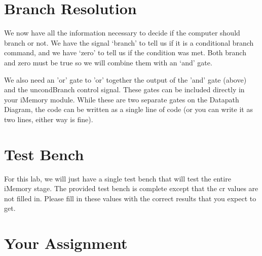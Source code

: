 \section{Branch Resolution}

We now have all the information necessary to decide if the computer should branch or not.  We have the signal `branch' to tell us if it is a conditional branch command, and we have `zero' to tell us if the condition was met.  Both branch and zero must be true so we will combine them with an `and' gate.

We also need an 'or' gate to 'or' together the output of the 'and' gate (above) and the uncondBranch control signal.  These gates can be included directly in your iMemory module. While these are two separate gates on the Datapath Diagram, the code can be written as a single line of code (or you can write it as two lines, either way is fine).

\section{Test Bench}
For this lab, we will just have a single test bench that will test the entire iMemory stage.  The provided test bench is complete except that the cr values are not filled in.  Please fill in these values with the correct results that you expect to get.

\section{Your Assignment}

